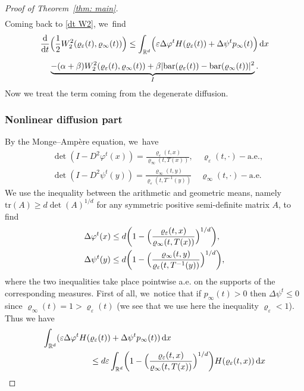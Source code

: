 \documentclass[11pt]{article}
\numberwithin{equation}{section}
\newcommand{\Bprt}[1]{\Bigl(#1\Bigr)}
\newcommand{\bbprt}[1]{\biggl(#1\biggr)}
\newcommand{\dx}[1]{\mathop{}\!\mathrm{d} #1}
\newcommand{\ddt}{\frac{\dx{}}{\dx{t}}}
\newcommand{\R}{\mathbb{R}}
\theoremstyle{plain}
\theoremstyle{remark}
\begin{document}
\begin{proof}[Proof of Theorem~\ref{thm: main}]
\begin{multline*}
\end{multline*}
Coming back to \eqref{dt W2}, we~find
\begin{multline}\label{final_singular}
\ddt \Bprt{\frac 12 W_2^2(\varrho_\varepsilon(t), \varrho_\infty(t))}\leq \int_{\R^d} \Bprt{\varepsilon\Delta \varphi^t H(\varrho_\varepsilon(t)) +\Delta \psi^t p_\infty(t) }\dx x \\[5pt]
\underbrace{- (\alpha+\beta) W_2^2(\varrho_\varepsilon(t), \varrho_\infty(t)) + \beta |\mathrm{bar}(\varrho_\varepsilon(t))- \mathrm{bar}(\varrho_\infty(t))|^2}_{I}.
\end{multline}
Now we treat the term coming from the degenerate diffusion.

\subsubsection*{Nonlinear diffusion part}
By the Monge--Ampère equation, we~have
\begin{align*}
&\det (I - D^2 \varphi^t(x)) = \frac{\varrho_\varepsilon(t,x)}{\varrho_\infty(t,T (x))}, \quad \varrho_{\varepsilon}(t,\cdot)-\mathrm{a.e.},\\
&\det (I - D^2 \psi^t(y)) = \frac{\varrho_\infty(t,y)}{\varrho_\varepsilon(t,T^{-1}(y))} \quad \varrho_{\infty}(t,\cdot)-\mathrm{a.e.}
\end{align*}
We use the inequality between the arithmetic and geometric means, namely $\mathrm{tr} (A) \geq d \det (A)^{1/d}$ for any symmetric positive semi-definite matrix $A$, to find
\begin{align*}
&\Delta \varphi^t(x)\leq d\bbprt{1-\Bprt{\frac{\varrho_\varepsilon(t,x)}{\varrho_\infty(t,T(x))}}^{1/d}}, \\
&\Delta \psi^t(y)\leq d\bbprt{1-\Bprt{\frac{\varrho_\infty(t,y)}{\varrho_\varepsilon(t,T^{-1}(y))}}^{1/d}},
\end{align*}
where the two inequalities take place pointwise a.e. on the supports of the corresponding measures.
First of all, we~notice that if $p_\infty(t)>0$ then $\Delta \psi^t\le 0$ since $\varrho_\infty(t)=1> \varrho_\varepsilon(t)$ (we see that we use here the inequality $ \varrho_\varepsilon<1$). Thus we have
\begin{equation*}
\begin{split}
\int_{\R^d} (\varepsilon \Delta \varphi^t H(&\varrho_\varepsilon(t)) +\Delta \psi^t p_\infty(t) )\dx x
\\
&\leq d \varepsilon \int_{\R^d} \bbprt{1-\Bprt{\frac{\varrho_\varepsilon(t,x)}{\varrho_\infty(t,T(x))}}^{1/d}} H(\varrho_\varepsilon(t,x)) \dx x\\

\end{split}
\end{equation*}
\end{proof}
\end{document}
